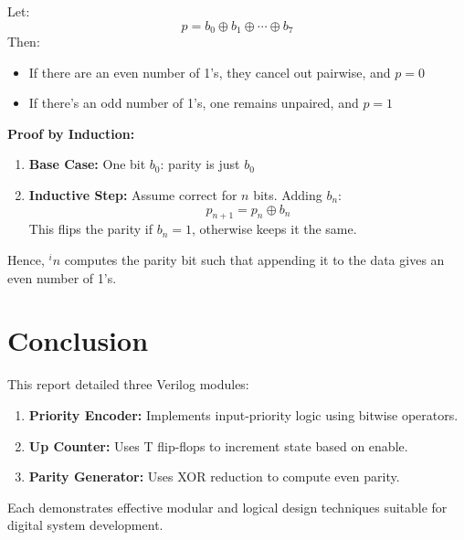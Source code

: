 \documentclass[11pt]{article}
\begin{document}
Let:
\[
p = b_0 \oplus b_1 \oplus \cdots \oplus b_7
\]
Then:
\begin{itemize}
    \item If there are an even number of 1's, they cancel out pairwise, and \(p = 0\)
    \item If there's an odd number of 1's, one remains unpaired, and \(p = 1\)
\end{itemize}

\textbf{Proof by Induction:}
\begin{enumerate}
    \item \textbf{Base Case:} One bit \(b_0\): parity is just \(b_0\)
    \item \textbf{Inductive Step:} Assume correct for \(n\) bits. Adding \(b_n\):
    \[
    p_{n+1} = p_n \oplus b_n
    \]
    This flips the parity if \(b_n = 1\), otherwise keeps it the same.
\end{enumerate}
Hence, \(^in\) computes the parity bit such that appending it to the data gives an even number of 1's.

\section{Conclusion}
This report detailed three Verilog modules:
\begin{enumerate}
    \item \textbf{Priority Encoder:} Implements input-priority logic using bitwise operators.
    \item \textbf{Up Counter:} Uses T flip-flops to increment state based on enable.
    \item \textbf{Parity Generator:} Uses XOR reduction to compute even parity.
\end{enumerate}
Each demonstrates effective modular and logical design techniques suitable for digital system development.
\end{document}
